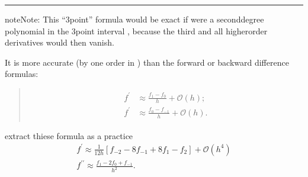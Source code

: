 \documentclass[letterpaper,10pt,english]{sphinxmanual}
\begin{document}
\bigskip\hrule\bigskip


\begin{sphinxadmonition}{note}{Note:}
\sphinxAtStartPar
This “3\sphinxhyphen{}point” formula would be exact if  were a second\sphinxhyphen{}degree polynomial in the 3\sphinxhyphen{}point interval \sphinxstyleemphasis{{[}\sphinxhyphen{}h,h{]}},
because the third\sphinxhyphen{} and all higherorder derivatives would then vanish.
\end{sphinxadmonition}

\sphinxAtStartPar
It is more accurate (by one order in  ) than the forward or backward difference formulas:
\begin{quote}
\begin{equation*}
\begin{split}\begin{aligned}
f^{\prime} & \approx \frac{f_{1}-f_{0}}{h}+\mathcal{O}(h) ; \\
f^{\prime} & \approx \frac{f_{0}-f_{-1}}{h}+\mathcal{O}(h) .
\end{aligned}\end{split}
\end{equation*}\end{quote}

\sphinxAtStartPar
extract thiese formula as a practice
\begin{equation*}
\begin{split}f^{\prime} \approx \frac{1}{12 h}\left[f_{-2}-8 f_{-1}+8 f_{1}-f_{2}\right]+\mathcal{O}\left(h^{4}\right) \\
f^{\prime \prime} \approx \frac{f_{1}-2 f_{0}+f_{-1}}{h^{2}} .\end{split}
\end{equation*}
\end{document}

